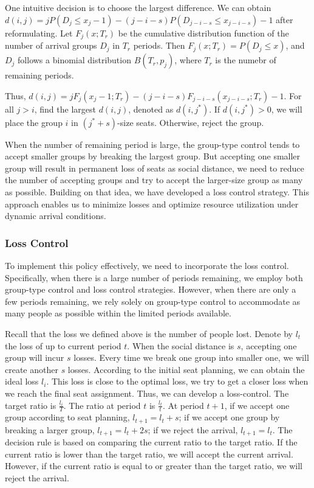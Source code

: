 One intuitive decision is to choose the largest difference. We can obtain $d(i,j) = j P(D_{j} \leq x_{j} -1) - (j-i-s)P(D_{j-i-s} \leq x_{j-i-s}) -1$ after reformulating. Let $F_{j}(x;T_r)$ be the cumulative distribution function of the number of arrival groups $D_{j}$ in $T_r$ periods. Then $F_{j}(x; T_{r}) = P(D_{j} \leq x)$, and $D_{j}$ follows a binomial distribution $B(T_{r}, p_{j})$, where $T_{r}$ is the numebr of remaining periods.

Thus, $d(i,j) = j F_{j}(x_{j}-1; T_r) - (j-i-s) F_{j-i-s}(x_{j-i-s}; T_r) -1$. For all $j >i$, find the largest $d(i,j)$, denoted as $d(i,j^{*})$. If $d(i,j^{*}) >0$, we will place the group $i$ in $(j^{*}+s)$-size seats. Otherwise, reject the group.


When the number of remaining period is large, the group-type control tends to accept smaller groups by breaking the largest group. But accepting one smaller group will result in permanent loss of seats as social distance, we need to reduce the number of accepting groups and try to accept the larger-size group as many as possible. Building on that idea, we have developed a loss control strategy. This approach enables us to minimize losses and optimize resource utilization under dynamic arrival conditions.

\subsubsection{Loss Control}
To implement this policy effectively, we need to incorporate the loss control. Specifically, when there is a large number of periods remaining, we employ both group-type control and loss control strategies. However, when there are only a few periods remaining, we rely solely on group-type control to accommodate as many people as possible within the limited periods available.

Recall that the loss we defined above is the number of people lost. Denote by $l_{t}$ the loss of up to current period $t$. When the social distance is $s$, accepting one group will incur $s$ losses. Every time we break one group into smaller one, we will create another $s$ losses. According to the initial seat planning, we can obtain the ideal loss $l_{i}$. This loss is close to the optimal loss, we try to get a closer loss when we reach the final seat assignment. Thus, we can develop a loss-control. The target ratio is $\frac{l_{i}}{T}$. The ratio at period $t$ is $\frac{l_{t}}{t}$. At period $t+1$, if we accept one group according to seat planning, $l_{t+1} = l_{t} + s$; if we accept one group by breaking a larger group, $l_{t+1} = l_{t} + 2s$; if we reject the arrival, $l_{t+1} = l_{t}$. The decision rule is based on comparing the current ratio to the target ratio. If the current ratio is lower than the target ratio, we will accept the current arrival. However, if the current ratio is equal to or greater than the target ratio, we will reject the arrival.

